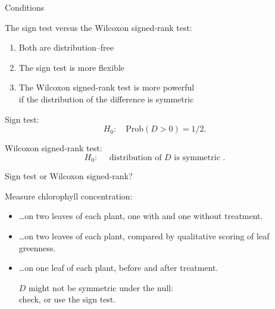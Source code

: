 \begin{frame}{Conditions}

  The sign test versus the Wilcoxon signed-rank test:
  \begin{enumerate}
    \item Both are distribution--free
    \item The sign test is \alert{more flexible} 
    \item The Wilcoxon signed-rank test is \alert{more powerful} \\
        if the distribution of the difference is symmetric
  \end{enumerate}

    \vspace{2em}

    Sign test:
    \[ H_0: \quad \mbox{Prob}(D>0) = 1/2 . \]

    \vspace{2em}

    Wilcoxon signed-rank test:
    \[ H_0: \quad \text{ distribution of $D$ is symmetric } .\]

\end{frame}

\begin{frame}{Sign test or Wilcoxon signed-rank?}

  Measure chlorophyll concentration:

  \begin{itemize}

    \item \ldots on two leaves of each plant, one with and one without treatment.
      \pause


    \item \ldots on two leaves of each plant, compared by qualitative scoring of leaf greenness.
      \pause


    \item \ldots on one leaf of each plant, before and after treatment.
      \pause

      \alert{$D$ might not be symmetric under the null:} \\
      check, or use the sign test.

  \end{itemize}

\end{frame}

